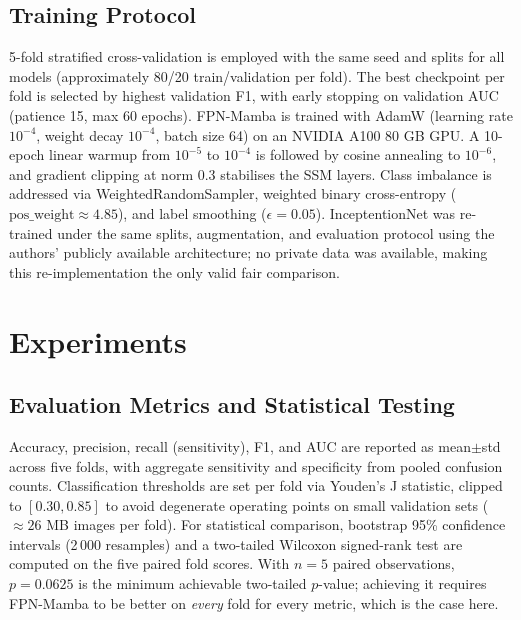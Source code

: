 \documentclass[runningheads]{llncs}
\begin{document}
\subsection{Training Protocol}
5-fold stratified cross-validation is employed with the same seed and splits for all models (approximately 80/20 train/validation per fold). The best checkpoint per fold is selected by highest validation F1, with early stopping on validation AUC (patience 15, max 60 epochs). FPN-Mamba is trained with AdamW (learning rate $10^{-4}$, weight decay $10^{-4}$, batch size 64) on an NVIDIA A100 80 GB GPU. A 10-epoch linear warmup from $10^{-5}$ to $10^{-4}$ is followed by cosine annealing to $10^{-6}$, and gradient clipping at norm 0.3 stabilises the SSM layers. Class imbalance is addressed via WeightedRandomSampler, weighted binary cross-entropy ($\text{pos\_weight}\approx4.85$), and label smoothing ($\epsilon=0.05$). InceptentionNet was re-trained under the same splits, augmentation, and evaluation protocol using the authors' publicly available architecture; no private data was available, making this re-implementation the only valid fair comparison.

\section{Experiments}
\subsection{Evaluation Metrics and Statistical Testing}
Accuracy, precision, recall (sensitivity), F1, and AUC are reported as mean$\pm$std across five folds, with aggregate sensitivity and specificity from pooled confusion counts. Classification thresholds are set per fold via Youden's J statistic, clipped to $[0.30, 0.85]$ to avoid degenerate operating points on small validation sets ($\approx26$ MB images per fold). For statistical comparison, bootstrap 95\% confidence intervals \cite{efron1993} (2\,000 resamples) and a two-tailed Wilcoxon signed-rank test \cite{wilcoxon1945} are computed on the five paired fold scores. With $n=5$ paired observations, $p=0.0625$ is the minimum achievable two-tailed $p$-value; achieving it requires FPN-Mamba to be better on \emph{every} fold for every metric, which is the case here.
\end{document}
